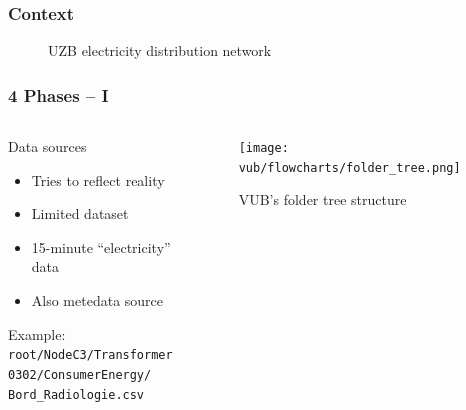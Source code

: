 \begin{frame}
    \frametitle{Context}
    \begin{figure}[ht]
        \caption{\acs{UZB} electricity distribution network} %
        \label{fig:bhc_site_layout}
    \end{figure}
\end{frame}

\begin{frame}
    \frametitle{4 Phases -- I}
    \vspace*{\fill}
    \begin{columns}[onlytextwidth, c]
        \begin{column}{.47\textwidth}
            \begin{exampleblock}{Data sources}
                \begin{itemize}
                    \item Tries to reflect reality
                    \item Limited dataset
                    \item 15-minute ``electricity'' data
                    \item Also metedata source
                \end{itemize}
                Example:\\
                \texttt{root/NodeC3/Transformer\\
                    0302/ConsumerEnergy/\\
                    Bord\_Radiologie.csv}
            \end{exampleblock}
        \end{column}

        \begin{column}{.52\textwidth}
            \begin{figure}[ht]
                \texttt{[image: vub/flowcharts/folder\_tree.png]}
                \caption{\acs{VUB}'s folder tree structure}
            \end{figure}
        \end{column}
    \end{columns}
    \vspace*{\fill}
\end{frame}


